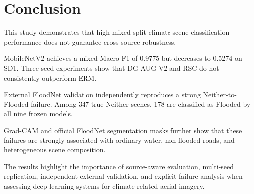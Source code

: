 \section{Conclusion}
\label{sec:conclusion}

This study demonstrates that high mixed-split climate-scene
classification performance does not guarantee cross-source
robustness.

MobileNetV2 achieves a mixed Macro-F1 of 0.9775 but decreases to
0.5274 on SD1. Three-seed experiments show that DG-AUG-V2 and RSC do
not consistently outperform ERM.

External FloodNet validation independently reproduces a strong
Neither-to-Flooded failure. Among 347 true-Neither scenes, 178 are
classified as Flooded by all nine frozen models.

Grad-CAM and official FloodNet segmentation masks further show that
these failures are strongly associated with ordinary water,
non-flooded roads, and heterogeneous scene composition.

The results highlight the importance of source-aware evaluation,
multi-seed replication, independent external validation, and explicit
failure analysis when assessing deep-learning systems for
climate-related aerial imagery.
